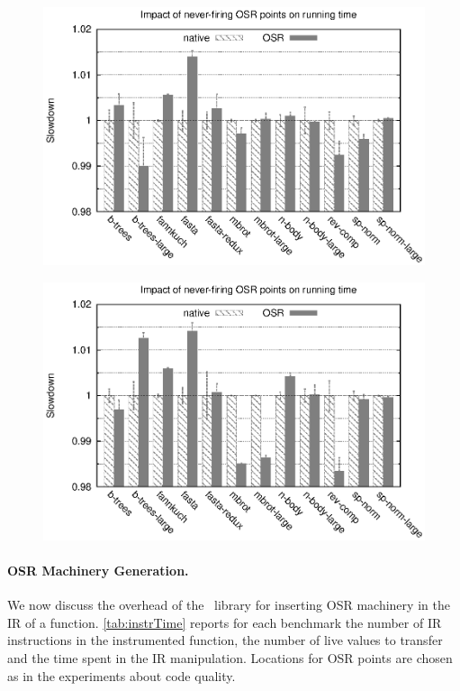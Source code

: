 \ifdefined\noauthorea
\begin{figure}[t]
\begin{center}
\includegraphics[width=0.95\columnwidth]{figures/code-quality-noBB/code-quality-noBB.eps}
\caption{\protect}
\end{center}
\end{figure}
\fi

\ifdefined\noauthorea
\begin{figure}[t]
\begin{center}
\includegraphics[width=0.95\columnwidth]{figures/code-quality-O1-noBB/code-quality-O1-noBB.eps}
\caption{\protect}
\end{center}
\end{figure}
\fi

\ifauthorea{\newline}{}
\paragraph{OSR Machinery Generation.}
We now discuss the overhead of the \osrkit\ library for inserting OSR machinery in the IR of a function. \mytable\ref{tab:instrTime} reports for each benchmark the number of IR instructions in the instrumented function, the number of live values to transfer and the time spent in the IR manipulation. Locations for OSR points are chosen as in the experiments about code quality.

